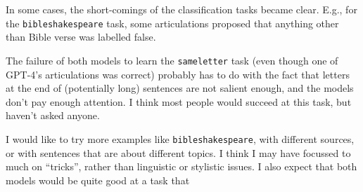 \documentclass{article}
\newcommand{\gptf}{GPT-4}
\begin{document}
In some cases, the short-comings of the classification tasks became clear.
E.g., for the \texttt{bibleshakespeare} task,
some articulations proposed that anything other than Bible verse was labelled false.

The failure of both models to learn the \texttt{sameletter} task
(even though one of \gptf{}'s articulations was correct)
probably has to do with the fact that letters at the end of (potentially long)
sentences are not salient enough,
and the models don't pay enough attention.
I think most people would succeed at this task,
but haven't asked anyone.

I would like to try more examples like \texttt{bibleshakespeare},
with different sources, or with sentences that are about different topics.
I think I may have focussed to much on ``tricks'', rather than linguistic or stylistic issues.
I also expect that both models would be quite good at a task that


















\end{document}
